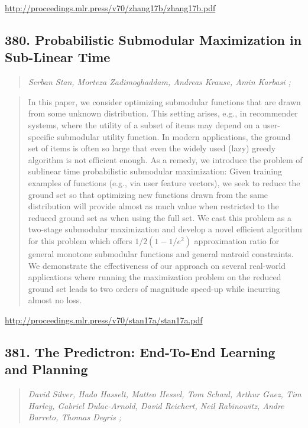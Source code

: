 \documentclass{article}
\begin{document}
\href{http://proceedings.mlr.press/v70/zhang17b/zhang17b.pdf}{http://proceedings.mlr.press/v70/zhang17b/zhang17b.pdf}

\subsection{380. Probabilistic Submodular Maximization in Sub-Linear Time}

\begin{quote}
\footnotesize{\textit{Serban Stan, Morteza Zadimoghaddam, Andreas Krause, Amin Karbasi ;}}

\end{quote}

\begin{quote}
    In this paper, we consider optimizing submodular functions that are drawn from some unknown distribution. This setting arises, e.g., in recommender systems, where the utility of a subset of items may depend on a user-specific submodular utility function. In modern applications, the ground set of items is often so large that even the widely used (lazy) greedy algorithm is not efficient enough. As a remedy, we introduce the problem of sublinear time probabilistic submodular maximization: Given training examples of functions (e.g., via user feature vectors), we seek to reduce the ground set so that optimizing new functions drawn from the same distribution will provide almost as much value when restricted to the reduced ground set as when using the full set. We cast this problem as a two-stage submodular maximization and develop a novel efficient algorithm for this problem which offers $1/2(1 - 1/e^2)$ approximation ratio for general monotone submodular functions and general matroid constraints. We demonstrate the effectiveness of our approach on several real-world applications where running the maximization problem on the reduced ground set leads to two orders of magnitude speed-up while incurring almost no loss.  
\end{quote}

\href{http://proceedings.mlr.press/v70/stan17a/stan17a.pdf}{http://proceedings.mlr.press/v70/stan17a/stan17a.pdf}

\subsection{381. The Predictron: End-To-End Learning and Planning}

\begin{quote}
\footnotesize{\textit{David Silver, Hado Hasselt, Matteo Hessel, Tom Schaul, Arthur Guez, Tim Harley, Gabriel Dulac-Arnold, David Reichert, Neil Rabinowitz, Andre Barreto, Thomas Degris ;}}

\end{quote}
\end{document}
